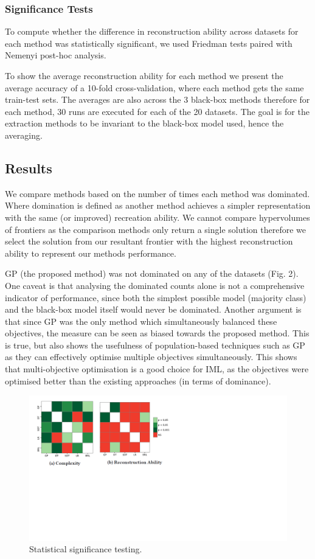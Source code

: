 \subsubsection{Significance Tests}
To compute whether the difference in reconstruction ability across datasets for each method was statistically significant, we used Friedman tests paired with Nemenyi post-hoc analysis.

To show the average reconstruction ability for each method we present the average accuracy of a 10-fold cross-validation, where each method gets the same train-test sets. The averages are also across the 3 black-box methods therefore for each method, 30 runs are executed for each of the 20 datasets. The goal is for the extraction methods to be invariant to the black-box model used, hence the averaging.
\subsection{Results}
We compare methods based on the number of times each method was dominated. Where domination is defined as another method achieves a simpler representation with the same (or improved) recreation ability. We cannot compare hypervolumes of frontiers as the comparison methods only return a single solution therefore we select the solution from our resultant frontier with the highest reconstruction ability to represent our methods performance.

GP (the proposed method) was not dominated on any of the datasets (Fig. 2). One caveat is that analysing the dominated counts alone is not a comprehensive indicator of performance, since both the simplest possible model (majority class) and the black-box model itself would never be dominated. Another argument is that since GP was the only method which simultaneously balanced these objectives, the measure can be seen as biased towards the proposed method. This is true, but also shows the usefulness of population-based techniques such as GP as they can effectively optimise multiple objectives simultaneously. This shows that multi-objective optimisation is a good choice for IML, as the objectives were optimised better than the existing approaches (in terms of dominance).
\begin{center}
\begin{figure}[h]
\includegraphics{result_analysis_resized}
\caption{Statistical significance testing.}
\end{figure}
\end{center}

